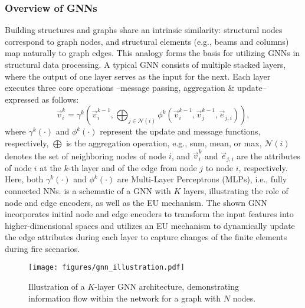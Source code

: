 \subsubsection{Overview of GNNs}
Building structures and graphs share an intrinsic similarity: structural nodes correspond to graph nodes, and structural elements (e.g., beams and columns) map naturally to graph edges. This analogy forms the basis for utilizing GNNs in structural data processing. A typical GNN consists of multiple stacked layers, where the output of one layer serves as the input for the next. Each  layer executes three core operations --message passing, aggregation \& update-- expressed as follows:
\begin{equation}
    \label{eq:gnn_overview}
    \vec{v}_i^k = \gamma^k \left( \vec{v}_i^{k-1}, \bigoplus_{j \in \mathcal{N}(i)} \phi^k \left( \vec{v}_i^{k-1}, \vec{v}_j^{k-1}, \vec{e}_{j,i} \right) \right),
\end{equation}
where $\gamma^k(\cdot)$ and $\phi^k(\cdot)$ represent the update and message functions, respectively, $\bigoplus$ is the aggregation operation, e.g., sum, mean, or max, $\mathcal{N}(i)$ denotes the set of neighboring nodes of node $i$, and $\vec{v}_i^k$ and $\vec{e}_{j,i}$ are the attributes of node $i$ at the $k$-th layer and of the edge from node $j$ to node $i$, respectively. Here, both $\gamma^k(\cdot)$ and $\phi^k(\cdot)$ are Multi-Layer Perceptrons (MLPs), i.e., fully connected NNs.   is a schematic of a GNN with $K$ layers, illustrating the role of node and edge encoders, as well as the EU mechanism. The shown GNN incorporates initial node and edge encoders to transform the input features into higher-dimensional spaces and utilizes an EU mechanism to dynamically update the edge attributes during each layer to capture changes of the finite elements during fire scenarios.
\begin{figure*}[h!]
    \centering
    \texttt{[image: figures/gnn\_illustration.pdf]}
    \caption{Illustration of a $K$-layer GNN architecture, demonstrating information flow within the network for a graph with $N$ nodes.}
    \label{fig:gnn_illustration}
\end{figure*}


